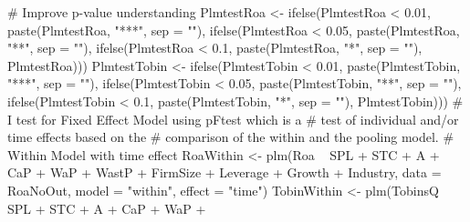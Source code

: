 \documentclass[12pt,]{article}
\newenvironment{Shaded}{}{}
\newcommand{\KeywordTok}[1]{\textcolor[rgb]{0.00,0.00,1.00}{#1}}
\newcommand{\DataTypeTok}[1]{#1}
\newcommand{\FloatTok}[1]{#1}
\newcommand{\StringTok}[1]{\textcolor[rgb]{0.00,0.50,0.50}{#1}}
\newcommand{\CommentTok}[1]{\textcolor[rgb]{0.00,0.50,0.00}{#1}}
\newcommand{\OperatorTok}[1]{#1}
\newcommand{\NormalTok}[1]{#1}
\begin{document}
\begin{Shaded}
\begin{Highlighting}[]
{{{{\CommentTok{# Improve p-value understanding}
\NormalTok{PlmtestRoa <-}\StringTok{ }\KeywordTok{ifelse}\NormalTok{(PlmtestRoa }\OperatorTok{<}\StringTok{ }\FloatTok{0.01}\NormalTok{, }\KeywordTok{paste}\NormalTok{(PlmtestRoa, }
    \StringTok{"***"}\NormalTok{, }\DataTypeTok{sep =} \StringTok{""}\NormalTok{), }\KeywordTok{ifelse}\NormalTok{(PlmtestRoa }\OperatorTok{<}\StringTok{ }\FloatTok{0.05}\NormalTok{, }\KeywordTok{paste}\NormalTok{(PlmtestRoa, }
    \StringTok{"**"}\NormalTok{, }\DataTypeTok{sep =} \StringTok{""}\NormalTok{), }\KeywordTok{ifelse}\NormalTok{(PlmtestRoa }\OperatorTok{<}\StringTok{ }\FloatTok{0.1}\NormalTok{, }\KeywordTok{paste}\NormalTok{(PlmtestRoa, }
    \StringTok{"*"}\NormalTok{, }\DataTypeTok{sep =} \StringTok{""}\NormalTok{), PlmtestRoa)))}
\NormalTok{PlmtestTobin <-}\StringTok{ }\KeywordTok{ifelse}\NormalTok{(PlmtestTobin }\OperatorTok{<}\StringTok{ }\FloatTok{0.01}\NormalTok{, }\KeywordTok{paste}\NormalTok{(PlmtestTobin, }
    \StringTok{"***"}\NormalTok{, }\DataTypeTok{sep =} \StringTok{""}\NormalTok{), }\KeywordTok{ifelse}\NormalTok{(PlmtestTobin }\OperatorTok{<}\StringTok{ }\FloatTok{0.05}\NormalTok{, }\KeywordTok{paste}\NormalTok{(PlmtestTobin, }
    \StringTok{"**"}\NormalTok{, }\DataTypeTok{sep =} \StringTok{""}\NormalTok{), }\KeywordTok{ifelse}\NormalTok{(PlmtestTobin }\OperatorTok{<}\StringTok{ }\FloatTok{0.1}\NormalTok{, }\KeywordTok{paste}\NormalTok{(PlmtestTobin, }
    \StringTok{"*"}\NormalTok{, }\DataTypeTok{sep =} \StringTok{""}\NormalTok{), PlmtestTobin)))}
\CommentTok{# I test for Fixed Effect Model using pFtest which is a}
\CommentTok{# test of individual and/or time effects based on the}
\CommentTok{# comparison of the within and the pooling model.}
\CommentTok{# Within Model with time effect}
\NormalTok{RoaWithin <-}\StringTok{ }\KeywordTok{plm}\NormalTok{(Roa }\OperatorTok{~}\StringTok{ }\NormalTok{SPL }\OperatorTok{+}\StringTok{ }\NormalTok{STC }\OperatorTok{+}\StringTok{ }\NormalTok{A }\OperatorTok{+}\StringTok{ }\NormalTok{CaP }\OperatorTok{+}\StringTok{ }\NormalTok{WaP }\OperatorTok{+}\StringTok{ }\NormalTok{WastP }\OperatorTok{+}\StringTok{ }
\StringTok{    }\NormalTok{FirmSize }\OperatorTok{+}\StringTok{ }\NormalTok{Leverage }\OperatorTok{+}\StringTok{ }\NormalTok{Growth }\OperatorTok{+}\StringTok{ }\NormalTok{Industry, }\DataTypeTok{data =}\NormalTok{ RoaNoOut, }
    \DataTypeTok{model =} \StringTok{"within"}\NormalTok{, }\DataTypeTok{effect =} \StringTok{"time"}\NormalTok{)}
\NormalTok{TobinWithin <-}\StringTok{ }\KeywordTok{plm}\NormalTok{(TobinsQ }\OperatorTok{~}\StringTok{ }\NormalTok{SPL }\OperatorTok{+}\StringTok{ }\NormalTok{STC }\OperatorTok{+}\StringTok{ }\NormalTok{A }\OperatorTok{+}\StringTok{ }\NormalTok{CaP }\OperatorTok{+}\StringTok{ }\NormalTok{WaP }\OperatorTok{+}\StringTok{ }
}}}}
\end{Highlighting}
\end{Shaded}
\end{document}
